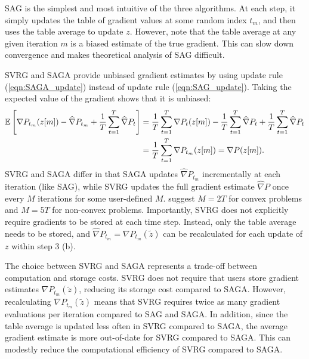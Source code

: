 SAG is the simplest and most intuitive of the three algorithms. At each step, it simply updates the table of gradient values at some random index $t_m$, and then uses the table average to update $z$. However, note that the table average at any given iteration $m$ is a biased estimate of the true gradient. This can slow down convergence and makes theoretical analysis of SAG difficult.

SVRG and SAGA provide unbiased gradient estimates by using update rule (\ref{eqn:SAGA_update}) instead of update rule (\ref{eqn:SAG_update}). Taking the expected value of the gradient shows that it is unbiased:
%
\begin{align*}
    \mathbb{E}\left[\nabla P_{t_m}(z[m]) - \widehat \nabla P_{t_m} + \frac{1}{T} \sum_{t=1}^T \widehat \nabla P_{t} \right] &= \frac{1}{T} \sum_{t=1}^T \nabla P_{t}(z[m]) - \frac{1}{T} \sum_{t=1}^T \widehat \nabla P_{t} + \frac{1}{T} \sum_{t=1}^T \widehat \nabla P_{t} \\
    &= \frac{1}{T} \sum_{t=1}^T \nabla P_{t_m}(z[m]) = \nabla P(z[m]).
\end{align*}
%
SVRG and SAGA differ in that SAGA updates $\widehat \nabla P_{t_m}$ incrementally at each iteration (like SAG), while SVRG updates the full gradient estimate $\widehat \nabla P$ once every $M$ iterations for some user-defined $M$. \citet{Johnson:2013} suggest $M = 2T$ for convex problems and $M = 5T$ for non-convex problems. Importantly, SVRG does not explicitly require gradients to be stored at each time step. Instead, only the table average needs to be stored, and $\widehat \nabla P_{t_m} = \nabla P_{t_m}(\tilde z)$ can be recalculated for each update of $z$ within step 3 (b). 

The choice between SVRG and SAGA represents a trade-off between computation and storage costs. SVRG does not require that users store gradient estimates $\nabla P_{t_m}(\tilde z)$, reducing its storage cost compared to SAGA. However, recalculating $\nabla P_{t_m}(\tilde z)$ means that SVRG requires twice as many gradient evaluations per iteration compared to SAG and SAGA. In addition, since the table average is updated less often in SVRG compared to SAGA, the average gradient estimate is more out-of-date for SVRG compared to SAGA. This can modestly reduce the computational efficiency of SVRG compared to SAGA.